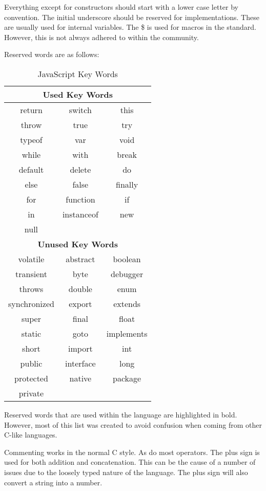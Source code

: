 			Everything except for constructors should start with a lower case letter by convention.
			The initial underscore should be reserved for implementations.
			These are usually used for internal variables.
			The \$ is used for macros in the standard.
			However, this is not always adhered to within the community.

			Reserved words are as follows:
			\begin{table}[htb]
				\centering
				\begin{tabular}{ccc}
					\toprule
					\multicolumn{3}{c}{\textbf{Used Key Words}} \\
					\toprule
					return & switch & this \\
					throw & true & try \\
					typeof & var & void \\
					while & with & break \\
					default & delete & do \\
					else & false & finally \\
					for & function & if \\
					in & instanceof & new  \\
					null & & \\
					\midrule
					\multicolumn{3}{c}{\textbf{Unused Key Words}} \\
					\midrule
					volatile & abstract & boolean \\
					transient & byte & debugger \\
					throws & double & enum \\
					synchronized & export & extends \\
					super & final & float \\
					static & goto & implements \\
					short & import & int \\
					public & interface & long \\
					protected & native & package \\
					private & & \\
					\bottomrule
				\end{tabular}
				\caption{JavaScript Key Words}
				\label{tab:JSKeyWords}
			\end{table}
			Reserved words that are used within the language are highlighted in bold.
			However, most of this list was created to avoid confusion when coming from other C-like languages.

			Commenting works in the normal C style.
			As do most operators.
			The plus sign is used for both addition and concatenation.
			This can be the cause of a number of issues due to the loosely typed nature of the language.
			The plus sign will also convert a string into a number.

